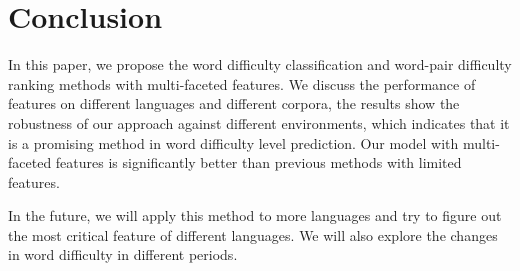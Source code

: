 \section{Conclusion}
\label{sec:conclude}

In this paper, we propose the word difficulty classification and word-pair difficulty ranking methods with multi-faceted features.
We discuss the performance of features on different languages and different corpora, the results show the robustness of our approach against different environments, which indicates that it is a promising method in word difficulty level prediction.
Our model with multi-faceted features is significantly better than previous methods with limited features.


In the future, we will apply this method to more languages and try to figure out the most critical feature of different languages.
We will also explore the changes in word difficulty in different periods.
